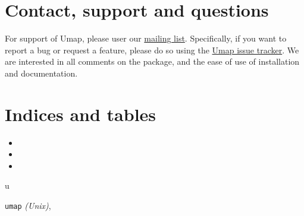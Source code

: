 \documentclass[letterpaper,10pt,english]{sphinxmanual}
\begin{document}
\chapter{Contact, support and questions}
\label{documentation:contact-support-and-questions}
For support of Umap, please user our \href{https://groups.google.com/forum/\#!forum/ubismap}{mailing list}.
Specifically, if you want to report a bug or request a feature,
please do so using
the \href{https://bitbucket.org/hoffmanlab/umap/issues}{Umap issue tracker}.
We are interested in all comments on the package,
and the ease of use of installation and documentation.


\chapter{Indices and tables}
\label{documentation:indices-and-tables}\begin{itemize}
\item {} 

\item {} 

\item {} 

\end{itemize}


\renewcommand{\indexname}{Python Module Index}
\begin{theindex}
\def\bigletter#1{{\Large\sffamily#1}\nopagebreak\vspace{1mm}}
\bigletter{u}
\item {\texttt{umap}} \emph{(Unix)}, \pageref{documentation:module-umap}
\end{theindex}

\renewcommand{\indexname}{Index}
\printindex
\end{document}
